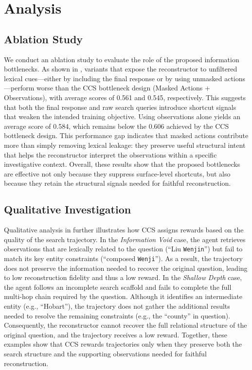 


\section{Analysis}

\subsection{Ablation Study}
We conduct an ablation study to evaluate the role of the proposed information bottlenecks. As shown in , variants that expose the reconstructor to unfiltered lexical cues---either by including the final response or by using unmasked actions---perform worse than the CCS bottleneck design (Masked Actions + Observations), with average scores of 0.561 and 0.545, respectively. This suggests that both the final response and raw search queries introduce shortcut signals that weaken the intended training objective.
Using observations alone yields an average score of 0.584, which remains below the 0.606 achieved by the CCS bottleneck design. This performance gap indicates that masked actions contribute more than simply removing lexical leakage: they preserve useful structural intent that helps the reconstructor interpret the observations within a specific investigative context. Overall, these results show that the proposed bottlenecks are effective not only because they suppress surface-level shortcuts, but also because they retain the structural signals needed for faithful reconstruction.

\subsection{Qualitative Investigation}
Qualitative analysis in  further illustrates how CCS assigns rewards based on the quality of the search trajectory. In the \emph{Information Void} case, the agent retrieves observations that are lexically related to the question (``Liu \texttt{Wenjin}'') but fail to match its key entity constraints (``composed \texttt{Wenji}''). As a result, the trajectory does not preserve the information needed to recover the original question, leading to low reconstruction fidelity and thus a low reward.
In the \emph{Shallow Depth} case, the agent follows an incomplete search scaffold and fails to complete the full multi-hop chain required by the question. Although it identifies an intermediate entity (e.g., ``Hobart''), the trajectory does not gather the additional results needed to resolve the remaining constraints (e.g., the ``county'' in question). Consequently, the reconstructor cannot recover the full relational structure of the original question, and the trajectory receives a low reward. Together, these examples show that CCS rewards trajectories only when they preserve both the search structure and the supporting observations needed for faithful reconstruction.


